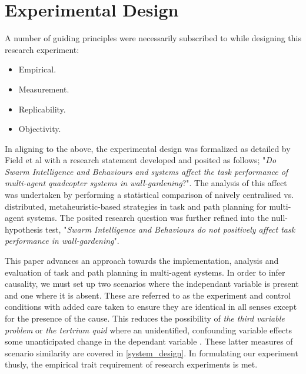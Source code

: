 \documentclass{report}
\begin{document}
\section{Experimental Design}
A number of guiding principles \cite{Field2012} were necessarily subscribed to while designing this research experiment:
\begin{itemize}
	\item Empirical.
	\item Measurement.
	\item Replicability.
	\item Objectivity.
\end{itemize}

In aligning to the above, the experimental design was formalized as detailed by Field et al \cite{Field2012} with a research statement developed and posited as follows; "\textit{Do Swarm Intelligence and Behaviours and systems affect the task performance of multi-agent quadcopter systems in wall-gardening}?". The analysis of this affect was undertaken by performing a statistical comparison of naively centralised vs. distributed, metaheuristic-based strategies in task and path planning for multi-agent systems. The posited research question was further refined into the null-hypothesis test, "\textit{Swarm Intelligence and Behaviours do not positively affect task performance in wall-gardening}".

This paper advances an approach towards the implementation, analysis and evaluation of task and path planning in multi-agent systems. In order to infer causality, we must set up two scenarios where the independant variable is present and one where it is absent. These are referred to as the experiment and control conditions with added care taken to ensure they are identical in all senses except for the presence of the cause. This reduces the possibility of \textit{the third variable problem} or \textit{the tertrium quid} where an unidentified, confounding variable effects some unanticipated change in the dependant variable \cite{Field2012}. These latter measures of scenario similarity are covered in \ref{system_design}. In formulating our experiment thusly, the empirical trait requirement of research experiments is met.
\end{document}
